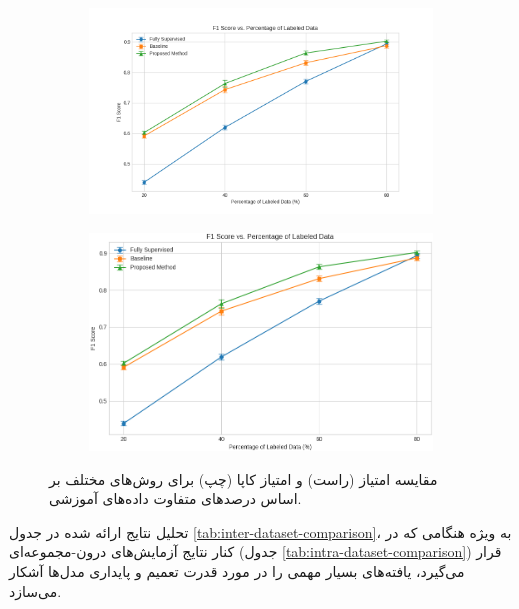 \begin{figure}[ht!]
    \centering
    \begin{subfigure}[b]{0.49\textwidth}
        \includegraphics[width=\textwidth]{Images/Chapter4/transfer-results-f1.png}
    \end{subfigure}
    \hfill %
    \begin{subfigure}[b]{0.49\textwidth}
        \includegraphics[width=\textwidth]{Images/Chapter4/transfer-results-kappa.png}
    \end{subfigure}
    \caption{مقایسه امتیاز  (راست) و امتیاز کاپا (چپ) برای روش‌های مختلف بر اساس درصدهای متفاوت داده‌های آموزشی.}
    \label{fig:transfer-results}
\end{figure}

تحلیل نتایج ارائه شده در جدول \ref{tab:inter-dataset-comparison}، به ویژه هنگامی که در کنار نتایج آزمایش‌های درون-مجموعه‌ای (جدول \ref{tab:intra-dataset-comparison}) قرار می‌گیرد، یافته‌های بسیار مهمی را در مورد قدرت تعمیم و پایداری مدل‌ها آشکار می‌سازد.

